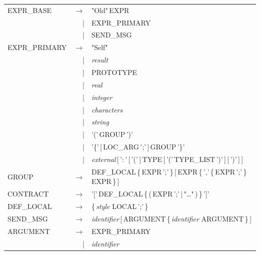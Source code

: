 \documentclass[11pt]{mybook}
\begin{document}
{\begin{tabular}{lrl}
EXPR\_BASE    & $\rightarrow$ & "Old"\,EXPR\\
              & |             & EXPR\_PRIMARY\\
              & |             & SEND\_MSG\\
EXPR\_PRIMARY & $\rightarrow$ & "Self"\\
              & |             & {\it{}result}\\
              & |             & PROTOTYPE\\
              & |             & {\it{}real}\\
              & |             & {\it{}integer}\\
              & |             & {\it{}characters}\\
              & |             & {\it{}string}\\
              & |             & '('\,GROUP\,')'\\
              & |             & '\{'\,[\,LOC\_ARG\,';'\,]\,GROUP\,'\}'\\
              & |             & {\it{}external}\,[\,'$\colon$'\,[\,'('\,]\,TYPE\,[\,'('\,TYPE\_LIST\,')'\,]\,[\,')'\,]\,]\\
GROUP         & $\rightarrow$ & DEF\_LOCAL\,\{\,EXPR\,';'\,\}\,[\,EXPR\,\{\,','\,\{\,EXPR\,';'\,\}\,EXPR\,\}\,]\\
CONTRACT      & $\rightarrow$ & '['\,DEF\_LOCAL\,\{\,(\,EXPR\,';'\,|\,"\ldots"\,)\,\}\,']'\\
DEF\_LOCAL    & $\rightarrow$ & \{\,{\it{}style} LOCAL\,';'\,\}\\
SEND\_MSG     & $\rightarrow$ & {\it{}identifier}\,[\,ARGUMENT\,\{\,{\it{}identifier} ARGUMENT\,\}\,]\\
ARGUMENT      & $\rightarrow$ & EXPR\_PRIMARY\\
              & |             & {\it{}identifier}\\
\end{tabular}}
\noindent
\end{document}
